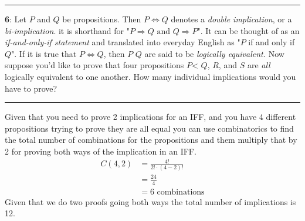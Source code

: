 \documentclass[11pt]{article}
\newcommand\question[2]{\vspace{.25in}\hrule\textbf{#1}: #2\vspace{.5em}\hrule\vspace{.10in}}
\begin{document}
\question{6}{Let $P$ and $Q$ be propositions. Then $P \iff Q$ denotes a \textit{double implication}, or a \textit{bi-implication}. it is shorthand for "$P \Rightarrow Q \text{ and } Q \Rightarrow P$". It can be thought of as an \textit{if-and-only-if statement} and translated into everyday English as "$P$ if and only if $Q$". If it is true that $P \iff Q$, then $P$ $Q$ are said to be \textit{logically equivalent.} \newline
Now suppose you'd like to prove that four propositions $P$< $Q$, $R$, and $S$ are \textit{all} logically equivalent to one another. How many individual implications would you have to prove?}
	Given that you need to prove 2 implications for an IFF, and you have 4 different propositions trying to prove they are all equal you can use combinatorics to find the total number of combinations for the propositions and them multiply that by 2 for proving both ways of the implication in an IFF.
	\begin{align*}
		C(4, 2) &= \frac{4!}{2! \cdot (4-2)!}\\
		&= \frac{24}{4}\\
		&= 6 \text{ combinations}
	\end{align*}
	Given that we do two proofs going both ways the total number of implications is 12.
	
\end{document}
